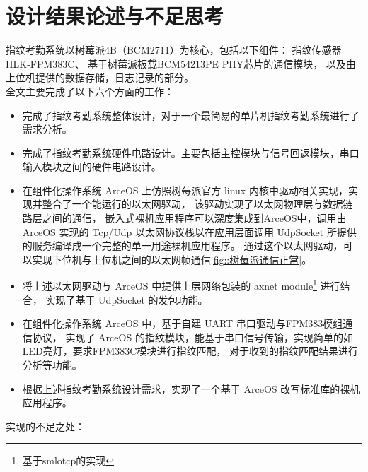 \section{设计结果论述与不足思考}

    指纹考勤系统以树莓派4B（BCM2711）为核心，包括以下组件：
    指纹传感器HLK-FPM383C、
    基于树莓派板载BCM54213PE PHY芯片的通信模块，
    以及由上位机提供的数据存储，日志记录的部分。\\

    \noindent 全文主要完成了以下六个方面的工作：

    \begin{itemize}
        \item 完成了指纹考勤系统整体设计，对于一个最简易的单片机指纹考勤系统进行了需求分析。
        \item 完成了指纹考勤系统硬件电路设计。主要包括主控模块与信号回返模块，串口输入模块之间的硬件电路设计。
        \item 在组件化操作系统 ArceOS 上仿照树莓派官方 linux 内核中驱动相关实现，实现并整合了一个能运行的以太网驱动，
            该驱动实现了以太网物理层与数据链路层之间的通信，
            嵌入式裸机应用程序可以深度集成到ArceOS中，调用由 ArceOS 实现的 Tcp/Udp 以太网协议栈以在应用层面调用 UdpSocket 所提供的服务编译成一个完整的单一用途裸机应用程序。
            通过这个以太网驱动，可以实现下位机与上位机之间的以太网帧通信\ref{fig::树莓派通信正常}。
        \item 将上述以太网驱动与 ArceOS 中提供上层网络包装的 axnet module\footnote{基于smlotcp的实现} 进行结合，
            实现了基于 UdpSocket 的发包功能。
        \item 在组件化操作系统 ArceOS 中，基于自建 UART 串口驱动与FPM383模组通信协议\cite{fpm383c-modular-communication-protocol}，
            实现了 ArceOS 的指纹模块，能基于串口信号传输，实现简单的如LED亮灯，要求FPM383C模块进行指纹匹配，
            对于收到的指纹匹配结果进行分析等功能。
        \item 根据上述指纹考勤系统设计需求，实现了一个基于 ArceOS 改写标准库的裸机应用程序。
    \end{itemize}

    \noindent 实现的不足之处：

